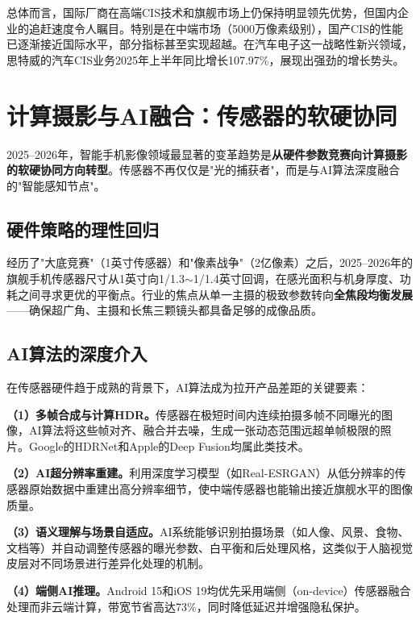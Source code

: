 \documentclass[12pt, a4paper]{ctexart}
\begin{document}
总体而言，国际厂商在高端CIS技术和旗舰市场上仍保持明显领先优势，但国内企业的追赶速度令人瞩目。特别是在中端市场（5000万像素级别），国产CIS的性能已逐渐接近国际水平，部分指标甚至实现超越。在汽车电子这一战略性新兴领域，思特威的汽车CIS业务2025年上半年同比增长107.97\%\cite{qqCIS2025}，展现出强劲的增长势头。


\section{计算摄影与AI融合：传感器的软硬协同}

2025--2026年，智能手机影像领域最显著的变革趋势是\textbf{从硬件参数竞赛向计算摄影的软硬协同方向转型}\cite{itbear2026}。传感器不再仅仅是"光的捕获者"，而是与AI算法深度融合的"智能感知节点"。

\subsection{硬件策略的理性回归}

经历了"大底竞赛"（1英寸传感器）和"像素战争"（2亿像素）之后，2025--2026年的旗舰手机传感器尺寸从1英寸向1/1.3$\sim$1/1.4英寸回调，在感光面积与机身厚度、功耗之间寻求更优的平衡点\cite{itbear2026}。行业的焦点从单一主摄的极致参数转向\textbf{全焦段均衡发展}——确保超广角、主摄和长焦三颗镜头都具备足够的成像品质。

\subsection{AI算法的深度介入}

在传感器硬件趋于成熟的背景下，AI算法成为拉开产品差距的关键要素：

\textbf{（1）多帧合成与计算HDR。}传感器在极短时间内连续拍摄多帧不同曝光的图像，AI算法将这些帧对齐、融合并去噪，生成一张动态范围远超单帧极限的照片。Google的HDRNet和Apple的Deep Fusion均属此类技术。

\textbf{（2）AI超分辨率重建。}利用深度学习模型（如Real-ESRGAN）从低分辨率的传感器原始数据中重建出高分辨率细节，使中端传感器也能输出接近旗舰水平的图像质量。

\textbf{（3）语义理解与场景自适应。}AI系统能够识别拍摄场景（如人像、风景、食物、文档等）并自动调整传感器的曝光参数、白平衡和后处理风格，这类似于人脑视觉皮层对不同场景进行差异化处理的机制。

\textbf{（4）端侧AI推理。}Android 15和iOS 19均优先采用端侧（on-device）传感器融合处理而非云端计算，带宽节省高达73\%，同时降低延迟并增强隐私保护\cite{alibaba2026}。
\end{document}
